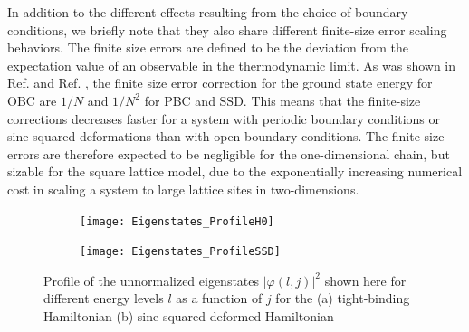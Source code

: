 \documentclass[11pt, a4paper, oneside]{book}
\theoremstyle{definition} %
\begin{document}
%
%
%
%
%



 
 
In addition to the different effects resulting from the choice of boundary conditions, we briefly note that they also share different finite-size error scaling behaviors. The finite size errors are defined to be the deviation from the expectation value of an observable in the thermodynamic limit. As was shown in Ref. \cite{Gendiar} and Ref. \cite{Gendiar2}, the finite size error correction for the ground state energy for OBC are $1/N$ and $1/N^2$ for PBC and SSD. This means that the finite-size corrections decreases faster for a system with periodic boundary conditions or sine-squared deformations than with open boundary conditions. The finite size errors are therefore expected to be negligible for the one-dimensional chain, but sizable for the square lattice model, due to the exponentially increasing numerical cost in scaling a system to large lattice sites in two-dimensions.   \\

\begin{figure}
\centering
\begin{subfigure}[t]{0.49\textwidth}
	\centering
	\texttt{[image: Eigenstates\_ProfileH0]}
	\caption{}
\end{subfigure}
\begin{subfigure}[t]{0.49\textwidth}
	\centering
	\texttt{[image: Eigenstates\_ProfileSSD]}
	\caption{}
	\label{fig:Eigenstates_ProfileSSD}
\end{subfigure}
\caption{Profile of the unnormalized eigenstates $|\varphi(l,j)|^2$ shown here for different energy levels $l$ as a function of $j$ for the (a) tight-binding Hamiltonian (b) sine-squared deformed Hamiltonian}
\label{fig:eigenstates_1d}
\end{figure}
\end{document}
